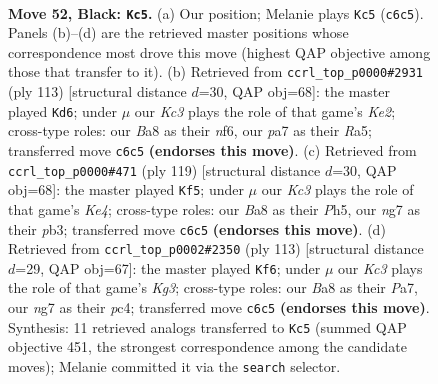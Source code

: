\documentclass[11pt]{article}
\begin{document}
\clearpage

\begin{figure}[p]\centering
\begin{subfigure}{0.46\textwidth}\centering
\resizebox{\linewidth}{!}{%
\newchessgame
\chessboard[
  setfen={b5K1/P4pNP/2kR4/4P3/8/8/5pr1/8 b - - 3 52},
  showmover=false,
  pgfstyle=straightmove, color=movearrow, markmove={c6-c5}
]}
\caption{}
\end{subfigure}\hfill
\begin{subfigure}{0.46\textwidth}\centering
\resizebox{\linewidth}{!}{%
\newchessgame
\chessboard[
  setfen={4R3/4kp2/5N2/r5P1/8/p6K/6P1/8 b - - 4 57},
  showmover=false,
  pgfstyle=straightmove, color=movearrow, markmove={e7-d6}
]}
\caption{}
\end{subfigure}
\\[4pt]
\begin{subfigure}{0.46\textwidth}\centering
\resizebox{\linewidth}{!}{%
\newchessgame
\chessboard[
  setfen={8/8/8/4k2p/4Rp1P/1P3P2/4K3/1r6 b - - 19 60},
  showmover=false,
  pgfstyle=straightmove, color=movearrow, markmove={e5-f5}
]}
\caption{}
\end{subfigure}\hfill
\begin{subfigure}{0.46\textwidth}\centering
\resizebox{\linewidth}{!}{%
\newchessgame
\chessboard[
  setfen={8/p3p3/6k1/P5R1/2P1KP1p/8/8/7r b - - 5 57},
  showmover=false,
  pgfstyle=straightmove, color=movearrow, markmove={g6-f6}
]}
\caption{}
\end{subfigure}
\caption{\textbf{Move 52, Black: \texttt{Kc5}.} (a) Our position; Melanie plays \texttt{Kc5} (\texttt{c6c5}). Panels (b)--(d) are the retrieved master positions whose correspondence most drove this move (highest QAP objective among those that transfer to it). (b) Retrieved from \texttt{ccrl\_top\_p0000\#2931} (ply 113) [structural distance $d$=30, QAP obj=68]: the master played \texttt{Kd6}; under $\mu$ our \emph{Kc3} plays the role of that game's \emph{Ke2}; cross-type roles: our \emph{B}a8 as their \emph{n}f6, our \emph{p}a7 as their \emph{R}a5; transferred move \texttt{c6c5} \textbf{(endorses this move)}. (c) Retrieved from \texttt{ccrl\_top\_p0000\#471} (ply 119) [structural distance $d$=30, QAP obj=68]: the master played \texttt{Kf5}; under $\mu$ our \emph{Kc3} plays the role of that game's \emph{Ke4}; cross-type roles: our \emph{B}a8 as their \emph{P}h5, our \emph{n}g7 as their \emph{p}b3; transferred move \texttt{c6c5} \textbf{(endorses this move)}. (d) Retrieved from \texttt{ccrl\_top\_p0002\#2350} (ply 113) [structural distance $d$=29, QAP obj=67]: the master played \texttt{Kf6}; under $\mu$ our \emph{Kc3} plays the role of that game's \emph{Kg3}; cross-type roles: our \emph{B}a8 as their \emph{P}a7, our \emph{n}g7 as their \emph{p}c4; transferred move \texttt{c6c5} \textbf{(endorses this move)}. Synthesis: 11 retrieved analogs transferred to \texttt{Kc5} (summed QAP objective 451, the strongest correspondence among the candidate moves); Melanie committed it via the \texttt{search} selector.}
\label{fig:thought-m103}
\end{figure}
\end{document}
